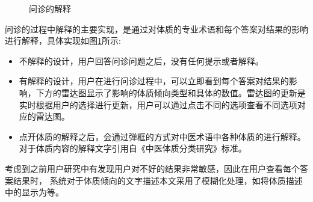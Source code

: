 \begin{figure}[htbp]
    \caption{问诊的解释} 
    \label{fig:questions}
\end{figure}

问诊的过程中解释的主要实现，是通过对体质的专业术语和每个答案对结果的影响进行解释，具体实现如图\ref{fig:questions}所示:
\begin{itemize}
    \item 不解释的设计，用户回答问诊问题之后，没有任何提示或者解释。
    \item 有解释的设计，用户在进行问诊过程中，可以立即看到每个答案对结果的影响，下方的雷达图显示了影响的体质倾向类型和具体的数值。雷达图的更新是实时根据用户的选择进行更新，用户可以通过点击不同的选项查看不同选项对应的雷达图。
    \item 点开体质的解释之后，会通过弹框的方式对中医术语中各种体质的进行解释。对于体质内容的解释文字引用自《中医体质分类研究》标准。
\end{itemize}

考虑到之前用户研究中有发现用户对不好的结果非常敏感，因此在用户查看每个答案结果时，
系统对于体质倾向的文字描述本文采用了模糊化处理，如将体质描述中的显示为等。


